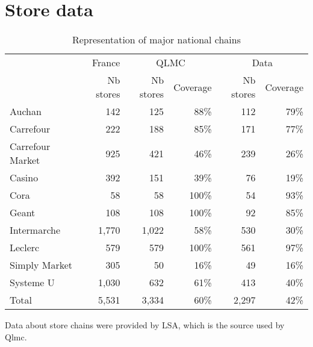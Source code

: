 \documentclass[english]{article}
\begin{document}
\appendix

\section{Store data}

\begin{table}[H]
\begin{threeparttable}
\renewcommand{\arraystretch}{0.7}%
\caption{Representation of major national chains}\label{tab:qlmc_chain_repr}
\small
\begin{tabular}{lr|rr|rr}
\toprule
          & France & \multicolumn{2}{c|}{QLMC} & \multicolumn{2}{c}{Data} \\
          & Nb stores & Nb stores & Coverage & Nb stores & Coverage \\
\midrule
    Auchan & 142   & 125   & 88\%  & 112   & 79\% \\
    Carrefour & 222   & 188   & 85\%  & 171   & 77\% \\
    Carrefour Market & 925   & 421   & 46\%  & 239   & 26\% \\
    Casino & 392   & 151   & 39\%  & 76    & 19\% \\
    Cora  & 58    & 58    & 100\% & 54    & 93\% \\
    Geant & 108   & 108   & 100\% & 92    & 85\% \\
    Intermarche & 1,770 & 1,022 & 58\%  & 530   & 30\% \\
    Leclerc & 579   & 579   & 100\% & 561   & 97\% \\
    Simply Market & 305   & 50    & 16\%  & 49    & 16\% \\
    Systeme U & 1,030 & 632   & 61\%  & 413   & 40\% \\
\midrule		
    Total & 5,531 & 3,334 & 60\%  & 2,297 & 42\% \\
\bottomrule
\bottomrule
\end{tabular}
\begin{tablenotes}
      \small
      \item Data about store chains were provided by LSA, which is the source used by Qlmc.
\end{tablenotes}
\end{threeparttable}
\end{table}
\end{document}
